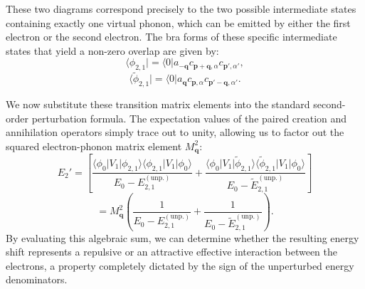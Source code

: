 
These two diagrams correspond precisely to the two possible intermediate states containing exactly one virtual phonon, which can be emitted by either the first electron or the second electron. The bra forms of these specific intermediate states that yield a non-zero overlap are given by:
\[
    \langle \phi_{2,1} | = \langle 0 | a_{-\mathbf{q}} c_{\mathbf{p}+\mathbf{q},\alpha} c_{\mathbf{p}',\alpha'},
\]
\[
    \langle \tilde{\phi}_{2,1} | = \langle 0 | a_{\mathbf{q}} c_{\mathbf{p},\alpha} c_{\mathbf{p}'-\mathbf{q},\alpha'}.
\]

We now substitute these transition matrix elements into the standard second-order perturbation formula. The expectation values of the paired creation and annihilation operators simply trace out to unity, allowing us to factor out the squared electron-phonon matrix element \( M_{\mathbf{q}}^2 \):
\[
    E_2' = \left[ \frac{\langle \phi_0 | V_1 | \phi_{2,1} \rangle \langle \phi_{2,1} | V_1 | \phi_0 \rangle}{E_0 - E_{2,1}^{(\text{unp.})}} + \frac{\langle \phi_0 | V_1 | \tilde{\phi}_{2,1} \rangle \langle \tilde{\phi}_{2,1} | V_1 | \phi_0 \rangle}{E_0 - \tilde{E}_{2,1}^{(\text{unp.})}} \right]
\]
\[
    = M_{\mathbf{q}}^2 \left( \frac{1}{E_0 - E_{2,1}^{(\text{unp.})}} + \frac{1}{E_0 - \tilde{E}_{2,1}^{(\text{unp.})}} \right).
\]
By evaluating this algebraic sum, we can determine whether the resulting energy shift represents a repulsive or an attractive effective interaction between the electrons, a property completely dictated by the sign of the unperturbed energy denominators.

